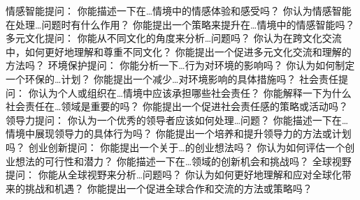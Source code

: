 \documentclass[12pt]{book}
\begin{document}
情感智能提问：
你能描述一下在…情境中的情感体验和感受吗？
你认为情感智能在处理…问题时有什么作用？
你能提出一个策略来提升在…情境中的情感智能吗？
多元文化提问：
你能从不同文化的角度来分析…问题吗？
你认为在跨文化交流中，如何更好地理解和尊重不同文化？
你能提出一个促进多元文化交流和理解的方法吗？
环境保护提问：
你能分析一下…行为对环境的影响吗？
你认为如何制定一个环保的…计划？
你能提出一个减少…对环境影响的具体措施吗？
社会责任提问：
你认为个人或组织在…情境中应该承担哪些社会责任？
你能解释一下为什么社会责任在…领域是重要的吗？
你能提出一个促进社会责任感的策略或活动吗？
领导力提问：
你认为一个优秀的领导者应该如何处理…问题？
你能描述一下在…情境中展现领导力的具体行为吗？
你能提出一个培养和提升领导力的方法或计划吗？
创业创新提问：
你能提出一个关于…的创业想法吗？
你认为如何评估一个创业想法的可行性和潜力？
你能描述一下在…领域的创新机会和挑战吗？
全球视野提问：
你能从全球视野来分析…问题吗？
你认为如何更好地理解和应对全球化带来的挑战和机遇？
你能提出一个促进全球合作和交流的方法或策略吗？
\end{document}
